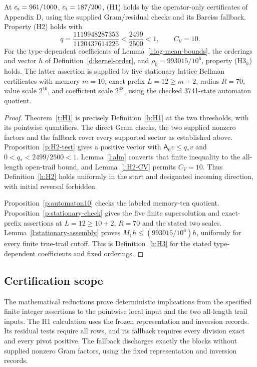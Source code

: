 \begin{theorem}\label{t:inputs}
At \(c_{\rm s}=961/1000\), \(c_{\rm t}=187/200\), (H1) holds
by the operator-only certificates of Appendix D, using the supplied
Gram/residual checks and its Bareiss fallback.
Property (H2) holds with
\[
 q=\frac{1119948287353}{1120437614225}<\frac{2499}{2500}<1,
 \qquad C_V=10 .
\]
For the type-dependent coefficients of Lemma~\ref{l:log-mean-bounds},
the orderings and vector \(h\) of Definition~\ref{d:kernel-order},
and \(\rho_0=993015/10^6\), property (H3\(_h\)) holds.
The latter assertion is supplied by five stationary lattice Bellman
certificates with memory \(m=10\), exact prefix \(L=12\ge m+2\),
radius \(R=70\), value scale \(2^{16}\), and coefficient scale
\(2^{48}\), using the checked 3741-state automaton quotient.
\end{theorem}

\begin{proof}
Theorem~\ref{t:H1} is precisely Definition~\ref{h:H1} at the two
thresholds, with its pointwise quantifiers. The direct Gram checks,
the two supplied nonzero factors and the fallback cover every
supported sector as established above.
Proposition~\ref{p:H2-test} gives a positive vector with
\(\mathsf A_6v\le q_*v\) and \(0<q_*<2499/2500<1\).
Lemma~\ref{l:alm} converts that finite inequality to the all-length
open-trail bound, and Lemma~\ref{l:H2-CV} permits \(C_V=10\).
Thus Definition~\ref{h:H2} holds uniformly in the start and
designated incoming direction, with initial reversal forbidden.

Proposition~\ref{p:automaton10} checks the labeled memory-ten
quotient. Proposition~\ref{p:stationary-check} gives the five
finite supersolution and exact-prefix assertions at
\(L=12\ge10+2\), \(R=70\) and the stated two scales.
Lemma~\ref{l:stationary-assembly} proves
\(M_1h\le(993015/10^6)h\), uniformly for every finite
true-trail cutoff. This is Definition~\ref{h:H3} for the stated
type-dependent coefficients and fixed orderings.
\end{proof}

\subsection*{Certification scope}
The mathematical reductions prove deterministic implications from
the specified finite integer assertions to the pointwise local
input and the two all-length trail inputs. The H1 calculation uses
the frozen representation and inversion records. Its residual
tests require all rows, and its fallback requires every division
exact and every pivot positive. The fallback discharges exactly
the blocks without supplied nonzero Gram factors, using the fixed
representation and inversion records.

